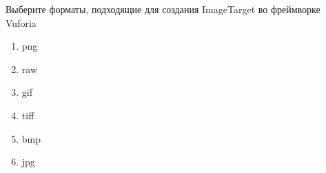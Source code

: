
Выберите форматы, подходящие для создания ImageTarget во фреймворке Vuforia

\begin{enumerate}
    \item png
    \item raw
    \item gif
    \item tiff
    \item bmp
    \item jpg
\end{enumerate}